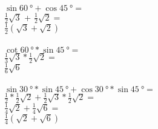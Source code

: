 \documentclass{article}
\begin{document}
 \\
$\sin \SI{60}{\degree} + \cos \SI{45}{\degree} =$ \\
$\frac{1}{2} \sqrt{3}$ + $\frac{1}{2} \sqrt{2} =$ \\
$\frac{1}{2} (\sqrt{3} + \sqrt{2})$ \\
 \\
$\cot \SI{60}{\degree} * \sin \SI{45}{\degree} =$ \\
$\frac{1}{3} \sqrt{3} * \frac{1}{2} \sqrt{2} = $ \\
$\frac{1}{6} \sqrt{6}$ \\
 \\
$\sin \SI{30}{\degree} * \sin \SI{45}{\degree} + \cos \SI{30}{\degree} * \sin \SI{45}{\degree} =$ \\
$\frac{1}{2} * \frac{1}{2} \sqrt{2} + \frac{1}{2} \sqrt{3} * \frac{1}{2} \sqrt{2}=$ \\
$\frac{1}{4} \sqrt{2} + \frac{1}{4} \sqrt{6} =$ \\
$\frac{1}{4} (\sqrt{2} + \sqrt{6})$
\end{document}
